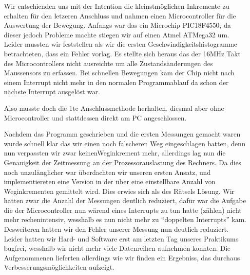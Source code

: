 \documentclass[12pt]{article}
\begin{document}
Wir entschienden uns mit der Intention die kleinstmöglichen Inkremente zu erhalten für den letzeren Anschluss und nahmen einen Microcontroller für die Auswertung der Bewegung. Anfangs war das ein Microchip PIC18F4550, da dieser jedoch Probleme machte stiegen wir auf einen Atmel ATMega32 um. Leider mussten wir feststellen als wir die ersten Geschwindigkeitshistogramme betrachteten, dass ein Fehler vorlag. Es stellte sich heraus das der 16MHz Takt des Microcontrollers nicht ausreichte um alle Zustandsänderungen des Maussensors zu erfassen. Bei schnellen Bewegungen kam der Chip nicht nach einem Interrupt nicht mehr in den normalen Programmablauf da schon der nächste Interrupt ausgelöst war.


Also musste doch die 1te Anschlussmethode herhalten, diesmal aber ohne Microcontroller und stattdessen direkt am PC angeschlossen.

Nachdem das Programm geschrieben und die ersten Messungen gemacht waren wurde schnell klar das wir einen noch falscheren Weg eingeschlagen hatten, denn nun verpassten wir zwar keinenWeginkrement mehr, allerdings 
lag nun die Genauigkeit der Zeitmessung an der Prozessorauslastung des Rechners. Da dies noch unzulänglicher war überdachten wir unseren ersten Ansatz, und implementiereten eine Version in der über eine einstellbare Anzahl von Weginkrementen gemittelt wird.
Dies erwies sich als des Rätsels Lösung. Wir hatten zwar die Anzahl der Messungen deutlich reduziert, dafür war die Aufgabe die der Microcontroller nun wärend eines Interrupts zu tun hatte (zählen) nicht mehr rechenintensiv, wesshalb es nun nicht mehr zu ``doppelten Interrupts'' kam.
Desweiteren hatten wir den Fehler unserer Messung nun deutlich reduziert. Leider hatten wir Hard- und Software erst am letzten Tag unseres Praktikums bugfrei, wesshalb wir nicht mehr viele Datenreihen aufnehmen konnten. Die Aufgenommenen lieferten allerdings wie wir finden ein 
Ergebniss, das durchaus Verbesserungsmöglichkeiten aufzeigt.
\end{document}
